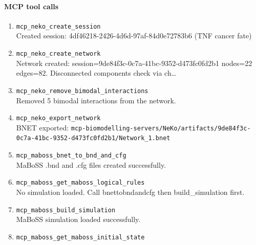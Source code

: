 \paragraph{MCP tool calls}
\begingroup
\small
\setlength{\itemsep}{5pt}
\setlength{\parskip}{0pt}
\begin{enumerate}
\item[1.] \texttt{mcp\_\allowbreak{}neko\_\allowbreak{}create\_\allowbreak{}session}
\hfill\\
\RaggedRight Created session: 4df46218-2426-4d6d-97af-84d0e72783b6 (TNF cancer fate)
\item[2.] \texttt{mcp\_\allowbreak{}neko\_\allowbreak{}create\_\allowbreak{}network}
\hfill\\
\RaggedRight Network created: session=9de84f3c-0c7a-41bc-9352-d473fc0fd2b1 nodes=22 edges=82. Disconnected components check via ch\ldots{}
\item[3.] \texttt{mcp\_\allowbreak{}neko\_\allowbreak{}remove\_\allowbreak{}bimodal\_\allowbreak{}interactions}
\hfill\\
\RaggedRight Removed 5 bimodal interactions from the network.
\item[4.] \texttt{mcp\_\allowbreak{}neko\_\allowbreak{}export\_\allowbreak{}network}
\hfill\\
\RaggedRight BNET exported: \texttt{mcp-\allowbreak{}biomodelling-\allowbreak{}servers/\allowbreak{}NeKo/\allowbreak{}artifacts/\allowbreak{}9de84f3c-\allowbreak{}0c7a-\allowbreak{}41bc-\allowbreak{}9352-\allowbreak{}d473fc0fd2b1/\allowbreak{}Network\_\allowbreak{}1.\allowbreak{}bnet}
\item[5.] \texttt{mcp\_\allowbreak{}maboss\_\allowbreak{}bnet\_\allowbreak{}to\_\allowbreak{}bnd\_\allowbreak{}and\_\allowbreak{}cfg}
\hfill\\
\RaggedRight MaBoSS .bnd and .cfg files created successfully.
\item[6.] \texttt{mcp\_\allowbreak{}maboss\_\allowbreak{}get\_\allowbreak{}maboss\_\allowbreak{}logical\_\allowbreak{}rules}
\hfill\\
\RaggedRight No simulation loaded. Call bnettobndandcfg then build\_simulation first.
\item[7.] \texttt{mcp\_\allowbreak{}maboss\_\allowbreak{}build\_\allowbreak{}simulation}
\hfill\\
\RaggedRight MaBoSS simulation loaded successfully.
\item[8.] \texttt{mcp\_\allowbreak{}maboss\_\allowbreak{}get\_\allowbreak{}maboss\_\allowbreak{}initial\_\allowbreak{}state}
\hfill\\

\end{enumerate}
